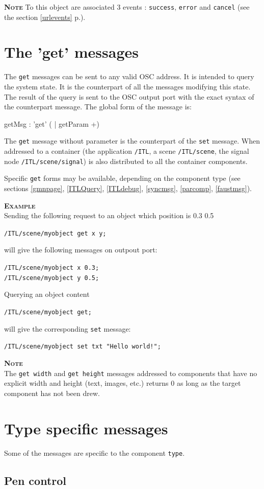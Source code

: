 \documentclass[a4paper,twoside]{report}
\newcommand{\toplevel}[1]	{\chapter{#1}}
\newcommand{\sublevel}[1]	{\section{#1}}
\newcommand{\fullref}[1]	{\ref{#1} p.\pageref{#1}}
\newcommand{\OSC}[1]		{\texttt{#1}}
\newcommand{\example}		{\textbf{\hspace{-1.5cm}\textbf{\textsc{Example }}}}
\newcommand{\note}	[1]		{\vspace{2mm}\textbf{\hspace{-1.03cm}\textbf{\textsc{Note #1}}}}
\newcommand{\sample}	[1]			{\vspace{-2mm}\begin{center}\colorbox{mygrey}{
								\begin{minipage}[t]{0.9\columnwidth} 
								{\small \texttt{#1}}
								\end{minipage}}\end{center}}
\newcommand{\sampleindent}	{ \hspace{0.5cm} }
\begin{document}
\note{} To this object are associated 3 events : \OSC{success}, \OSC{error} and \OSC{cancel} (see the section \fullref{urlevents}).

\toplevel{The 'get' messages}
\label{getsect}

The \OSC{get} messages can be sent to any valid OSC address. It is intended to query the system state. It is the counterpart of all the messages modifying this state.  The result of the query is sent to the OSC output port with the exact syntax of the counterpart message. 
The global form of the message is:
\begin{rail}
getMsg : 'get' ( | getParam +)
\end{rail}

The \OSC{get} message without parameter is the counterpart of the \OSC{set} message. When addressed to a container (the application \OSC{/ITL}, a scene \OSC{/ITL/scene}, the signal node \OSC{/ITL/scene/signal}) is also distributed to all the container components.

Specific \OSC{get} forms may be available, depending on the component type (see sections \ref{gmnpage},  \ref{ITLQuery}, \ref{ITLdebug}, \ref{syncmsg}, \ref{parcomp}, \ref{faustmsg}).

\example \\
Sending the following request to an object which position is 0.3 0.5
\sample{/ITL/scene/myobject get x y;}
\sampleindent will give the following messages on outpout port:
\sample{/ITL/scene/myobject x 0.3; \\
/ITL/scene/myobject y 0.5;}
Querying an object content
\sample{/ITL/scene/myobject get;}
\sampleindent will give the corresponding \OSC{set} message:
\sample{/ITL/scene/myobject set txt "Hello world!";}

\note{} \\
The \OSC{get width} and \OSC{get height} messages addressed to components that have no explicit width and height (text, images, etc.) returns 0 as long as the target component has not been drew.



\toplevel{Type specific messages}
\label{specificMsg}
Some of the messages are specific to the component \OSC{type}.


\sublevel{Pen control}
\end{document}
